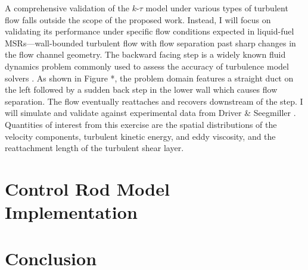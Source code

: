 A comprehensive validation of the $k$-$\tau$ model under various types of
turbulent flow falls outside the scope of the proposed work. Instead, I will
focus on validating its performance under specific flow conditions expected in
liquid-fuel \glspl{MSR}---wall-bounded turbulent flow with flow separation past
sharp changes in the flow channel geometry. The backward facing step is a
widely known fluid dynamics problem commonly used to assess the accuracy of
turbulence model solvers \cite{lasher_computation_1992}. As shown in Figure *,
the problem domain features a straight duct
on the left followed by a sudden back step in the lower wall which causes flow
separation. The flow eventually reattaches and recovers downstream of the step.
I will simulate and validate against experimental data from Driver \&
Seegmiller \cite{driver_features_1985}. Quantities of interest from this
exercise are the spatial distributions of the velocity components, turbulent
kinetic energy, and eddy viscosity, and the reattachment length of the
turbulent shear layer.

\section{Control Rod Model Implementation}

\section{Conclusion}
